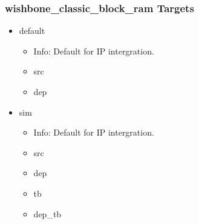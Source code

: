 \subsubsection{wishbone\_classic\_block\_ram Targets}
\begin{itemize}
\item default
	\begin{itemize}
	\item[$\space$] Info: Default for IP intergration.
	\item src
	\item dep
	\end{itemize}
\item sim
	\begin{itemize}
	\item[$\space$] Info: Default for IP intergration.
	\item src
	\item dep
	\item tb
	\item dep\_tb
	\end{itemize}
\end{itemize}
